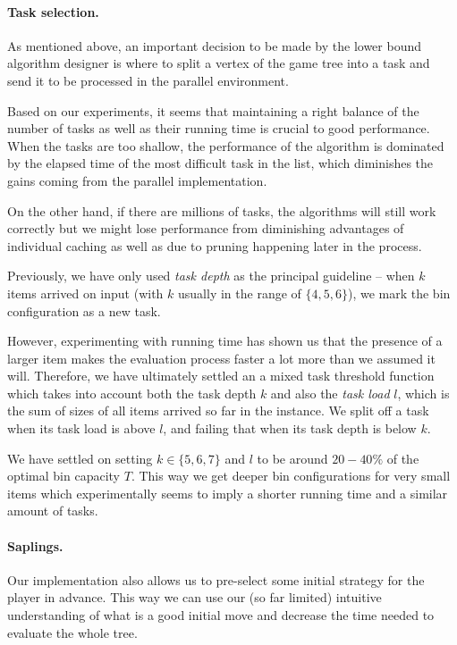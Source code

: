 \paragraph{Task selection.} As mentioned above, an important decision
to be made by the lower bound algorithm designer is where to split a
vertex of the game tree into a task and send it to be processed in the
parallel environment.

Based on our experiments, it seems that maintaining a right balance of
the number of tasks as well as their running time is crucial to good
performance. When the tasks are too shallow, the performance of the
algorithm is dominated by the elapsed time of the most difficult task
in the list, which diminishes the gains coming from the parallel
implementation.

On the other hand, if there are millions of tasks, the algorithms will
still work correctly but we might lose performance from diminishing
advantages of individual caching as well as due to pruning happening
later in the process.

Previously, we have only used \emph{task depth} as the principal
guideline -- when $k$ items arrived on input (with $k$ usually in the
range of $\{4,5,6\}$), we mark the bin configuration as a new task.

However, experimenting with running time has shown us that the
presence of a larger item makes the evaluation process faster a lot
more than we assumed it will. Therefore, we have ultimately settled an
a mixed task threshold function which takes into account both the task
depth $k$ and also the \emph{task load} $l$, which is the sum of sizes
of all items arrived so far in the instance. We split off a task when
its task load is above $l$, and failing that when its task depth is
below $k$.

We have settled on setting $k \in \{5,6,7\}$ and $l$ to be around
$20-40\%$ of the optimal bin capacity $T$. This way we get deeper bin
configurations for very small items which experimentally seems to
imply a shorter running time and a similar amount of tasks.

\paragraph{Saplings.} Our implementation also allows us to pre-select
some initial strategy for the player \adversary in advance. This way
we can use our (so far limited) intuitive understanding of what is a
good initial move and decrease the time needed to evaluate the whole
tree.

